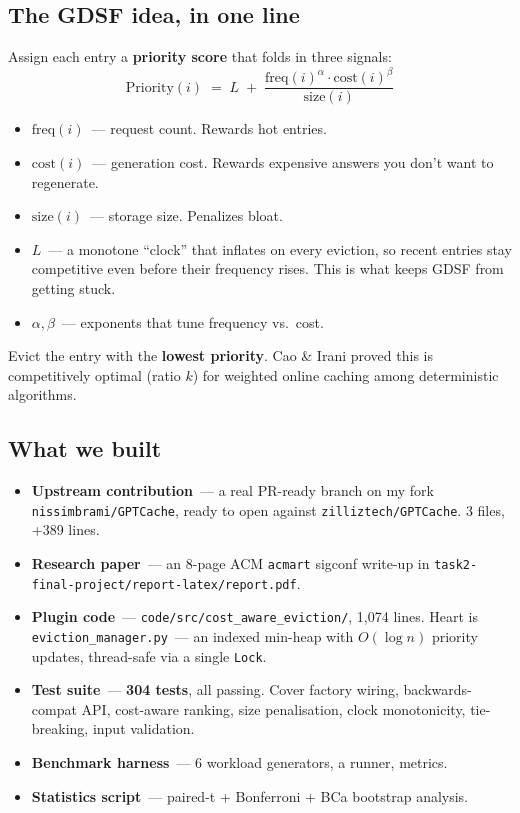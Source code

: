 \documentclass[11pt,a4paper]{article}
\begin{document}
\subsection{The GDSF idea, in one line}
Assign each entry a \textbf{priority score} that folds in three signals:
\[
  \text{Priority}(i) \;=\; L \;+\; \frac{\mathrm{freq}(i)^{\alpha} \cdot \mathrm{cost}(i)^{\beta}}{\mathrm{size}(i)}
\]
\begin{itemize}[leftmargin=1.5em,itemsep=0.05em]
  \item $\mathrm{freq}(i)$~--- request count. Rewards hot entries.
  \item $\mathrm{cost}(i)$~--- generation cost. Rewards expensive
        answers you don't want to regenerate.
  \item $\mathrm{size}(i)$~--- storage size. Penalizes bloat.
  \item $L$~--- a monotone ``clock'' that inflates on every eviction, so
        recent entries stay competitive even before their frequency
        rises. This is what keeps GDSF from getting stuck.
  \item $\alpha, \beta$~--- exponents that tune frequency vs.\ cost.
\end{itemize}
Evict the entry with the \textbf{lowest priority}. Cao \& Irani proved
this is competitively optimal (ratio $k$) for weighted online caching
among deterministic algorithms.

\subsection{What we built}
\begin{itemize}[leftmargin=1.5em,itemsep=0.1em]
  \item \textbf{Upstream contribution}~--- a real PR-ready branch on my
        fork \texttt{nissimbrami/GPTCache}, ready to open against
        \texttt{zilliztech/GPTCache}. 3 files, +389 lines.
  \item \textbf{Research paper}~--- an 8-page ACM \texttt{acmart} sigconf
        write-up in \texttt{task2-final-project/report-latex/report.pdf}.
  \item \textbf{Plugin code}~---
        \texttt{code/src/cost\_aware\_eviction/}, 1{,}074 lines. Heart
        is \texttt{eviction\_manager.py}~--- an indexed min-heap with
        $O(\log n)$ priority updates, thread-safe via a single
        \texttt{Lock}.
  \item \textbf{Test suite}~--- \textbf{304 tests}, all
        passing. Cover factory wiring, backwards-compat API, cost-aware
        ranking, size penalisation, clock monotonicity, tie-breaking,
        input validation.
  \item \textbf{Benchmark harness}~--- 6 workload generators, a runner,
        metrics.
  \item \textbf{Statistics script}~--- paired-t + Bonferroni + BCa
        bootstrap analysis.
\end{itemize}
\end{document}
